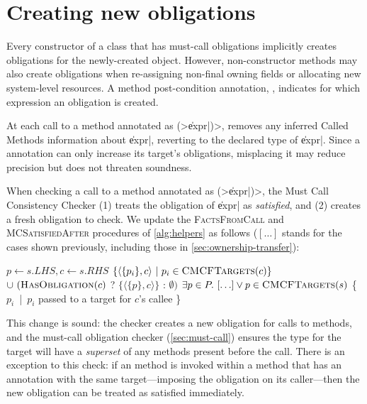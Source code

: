 \section{Creating new obligations}
\label{sec:reset-must-call}

Every constructor of a class that has must-call obligations
implicitly creates obligations for the newly-created object.
However, non-constructor methods may also create obligations
when re-assigning non-final owning fields or allocating
new system-level resources.
A method post-condition annotation,
\CreatesMustCallFor,
indicates for which expression an obligation is created.

At each call to a method annotated as \CreatesMustCallFor\<(>\|expr|\<)>, \tool removes any
inferred Called Methods information about \|expr|, reverting to
the declared type of \|expr|.
Since a \CreatesMustCallFor annotation can only increase its target's obligations,
misplacing it may reduce precision but does not threaten soundness.

When checking a call to a method annotated as
\CreatesMustCallFor\<(>\|expr|\<)>, the Must Call Consistency Checker
(1) treats the \MustCall
obligation of \|expr| as \emph{satisfied},
and (2) creates a fresh obligation to check.
%
We update the \textsc{FactsFromCall} and \textsc{MCSatisfiedAfter} procedures of
\cref{alg:helpers} as follows ($[\ldots]$ stands for the cases shown previously,
including those in \cref{sec:ownership-transfer}):
\begin{algorithmic}
  \State $p \gets s.LHS, c \gets s.RHS$
  \State \Return $\{ \langle \{ p_i \}, c \rangle\ |\ p_i \in \textsc{CMCFTargets}(c) \}$ \newline
  \hspace*{5em} $\cup\ (\textsc{HasObligation}(c)$ ? $\{ \langle \{ p \}, c \rangle \}$ : $\emptyset)$
  \EndProcedure
  \State \Return $\exists p \in P .\ [\ldots] \vee p \in \textsc{CMCFTargets}(s)$
  \EndProcedure
  \State \Return \{ $p_i$\ |\ $p_i$ passed to a \CreatesMustCallFor target for $c$'s callee \}
  \EndProcedure
\end{algorithmic}
\noindent
This change is sound: the checker creates a new obligation for calls to
\CreatesMustCallFor methods, and the must-call obligation checker (\cref{sec:must-call}) ensures the
\MustCall type for the target will have a \emph{superset} of any methods present
before the call.
There is an exception to this check: if an \CreatesMustCallFor
method is invoked within a method that has an \CreatesMustCallFor annotation
with the same target---imposing the obligation on its caller---then
the new obligation can be treated as satisfied immediately.


